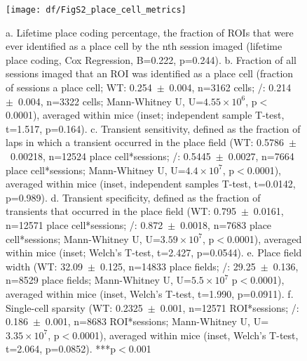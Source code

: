 \begin{figure}
	\centering
	\texttt{[image: df/FigS2\_place\_cell\_metrics]}
	\caption[Comparison of lifetime place coding and additional place cell metrics]{a. Lifetime place coding percentage, the fraction of ROIs that were ever identified as a place cell by the nth session imaged (lifetime place coding, Cox Regression, B=0.222, p=0.244).
	b. Fraction of all sessions imaged that an ROI was identified as a place cell (fraction of sessions a place cell; WT: 0.254~$\pm$~0.004, n=3162 cells; \df/: 0.214~$\pm$~0.004, n=3322 cells; Mann-Whitney U, U=$4.55\times10^6$, p$<$0.0001), averaged within mice (inset; independent sample T-test, t=1.517, p=0.164).
	c. Transient sensitivity, defined as the fraction of laps in which a transient occurred in the place field (WT: 0.5786~$\pm$~0.00218, n=12524 place cell*sessions; \df/: 0.5445~$\pm$~0.0027, n=7664 place cell*sessions; Mann-Whitney U, U=$4.4\times10^7$, p$<$0.0001), averaged within mice (inset, independent samples T-test, t=0.0142, p=0.989).
	d. Transient specificity, defined as the fraction of transients that occurred in the place field (WT: 0.795~$\pm$~0.0161, n=12571 place cell*sessions; \df/: 0.872~$\pm$~0.0018, n=7683 place cell*sessions; Mann-Whitney U, U=$3.59\times10^7$, p$<$0.0001), averaged within mice (inset; Welch's T-test, t=2.427, p=0.0544).
	e. Place field width (WT: 32.09~$\pm$~0.125, n=14833 place fields; \df/: 29.25~$\pm$~0.136, n=8529 place fields; Mann-Whitney U, U=$5.5\times10^7$ p$<$0.0001), averaged within mice (inset, Welch's T-test, t=1.990, p=0.0911).
	f. Single-cell sparsity (WT: 0.2325~$\pm$~0.001, n=12571 ROI*sessions; \df/: 0.186~$\pm$~0.001, n=8683 ROI*sessions; Mann-Whitney U, U=$3.35\times10^7$, p$<$0.0001), averaged within mice (inset, Welch's T-test, t=2.064, p=0.0852). ***p$<$0.001}
	\label{fig:df:supp_place_metrics}
\end{figure}

